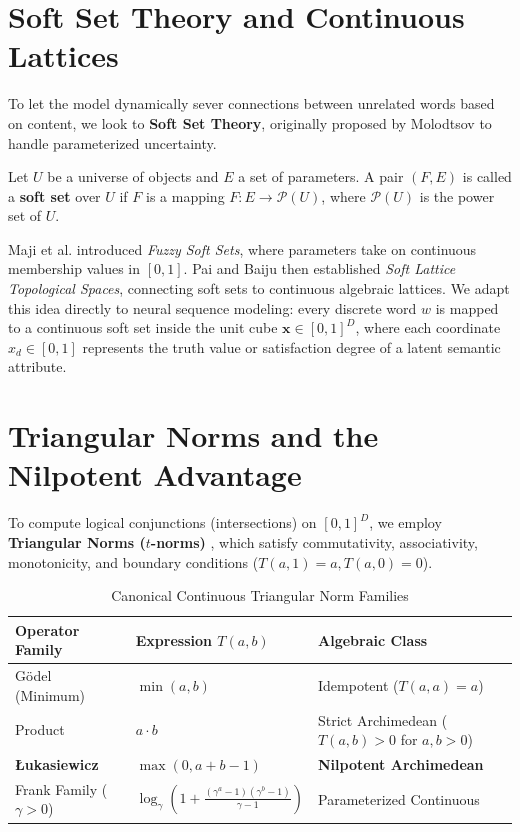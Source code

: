 \section{Soft Set Theory and Continuous Lattices}
To let the model dynamically sever connections between unrelated words based on content, we look to \textbf{Soft Set Theory}, originally proposed by Molodtsov \cite{molodtsov1999soft} to handle parameterized uncertainty.
\begin{Definition}
Let $U$ be a universe of objects and $E$ a set of parameters. A pair $(F, E)$ is called a \textbf{soft set} over $U$ if $F$ is a mapping $F: E \to \mathcal{P}(U)$, where $\mathcal{P}(U)$ is the power set of $U$.
\end{Definition}
Maji et al. \cite{maji2001fuzzy} introduced \textit{Fuzzy Soft Sets}, where parameters take on continuous membership values in $[0, 1]$. Pai and Baiju \cite{pai2021soft} then established \textit{Soft Lattice Topological Spaces}, connecting soft sets to continuous algebraic lattices. We adapt this idea directly to neural sequence modeling: every discrete word $w$ is mapped to a continuous soft set inside the unit cube $\mathbf{x} \in [0, 1]^D$, where each coordinate $x_d \in [0, 1]$ represents the truth value or satisfaction degree of a latent semantic attribute.

\section{Triangular Norms and the Nilpotent Advantage}
To compute logical conjunctions (intersections) on $[0, 1]^D$, we employ \textbf{Triangular Norms ($t$-norms)} \cite{klement2000triangular}, which satisfy commutativity, associativity, monotonicity, and boundary conditions ($T(a, 1) = a, T(a, 0) = 0$).

\begin{table}[htbp]
\centering
\caption{Canonical Continuous Triangular Norm Families}
\label{tab:tnorm_families}
\small
\renewcommand{\arraystretch}{0.95}
\begin{tabular}{lll}
\toprule
\textbf{Operator Family} & \textbf{Expression $T(a, b)$} & \textbf{Algebraic Class} \\
\midrule
G\"odel (Minimum) & $\min(a, b)$ & Idempotent ($T(a, a) = a$) \\
Product & $a \cdot b$ & Strict Archimedean ($T(a, b) > 0$ for $a, b > 0$) \\
\textbf{\L{}ukasiewicz} & $\max(0, a + b - 1)$ & \textbf{Nilpotent Archimedean} \\
Frank Family ($\gamma > 0$) & $\log_\gamma\left(1 + \frac{(\gamma^a - 1)(\gamma^b - 1)}{\gamma - 1}\right)$ & Parameterized Continuous \\
\bottomrule
\end{tabular}
\end{table}

